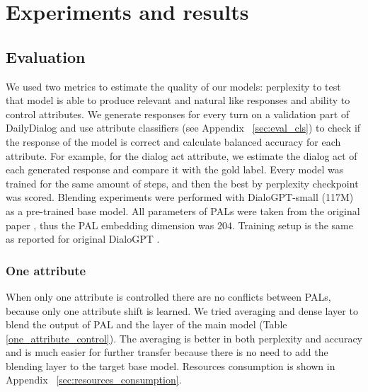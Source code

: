 \documentclass[11pt]{article}
\begin{document}
\section{Experiments and results}

\subsection{Evaluation}

We used two metrics to estimate the quality of our models:  perplexity to test that model is able to produce relevant and natural like responses and ability to control attributes. We generate responses for every turn on a validation part of DailyDialog and use attribute classifiers (see Appendix ~\ref{sec:eval_cls}) to check if the response of the model is correct and calculate balanced accuracy for each attribute. For example, for the dialog act attribute, we estimate the dialog act of each generated response and compare it with the gold label.
Every model was trained for the same amount of steps, and then the best by perplexity checkpoint was scored.
Blending experiments were performed with DialoGPT-small (117M) as a pre-trained base model. All parameters of PALs were taken from the original paper \cite{stickland2019bert}, thus the PAL embedding dimension was $204$. Training setup is the same as reported for original DialoGPT \cite{zhang2020dialogpt}. 

\subsubsection{One attribute}

When only one attribute is controlled there are no conflicts between PALs, because only one attribute shift is learned. We tried averaging and dense layer to blend the output of PAL and the layer of the main model (Table \ref{one_attribute_control}). The averaging is better in both perplexity and accuracy and is much easier for further  transfer because there is no need to add the blending layer to the target base model. Resources consumption is shown in Appendix ~\ref{sec:resources_consumption}.
\end{document}
